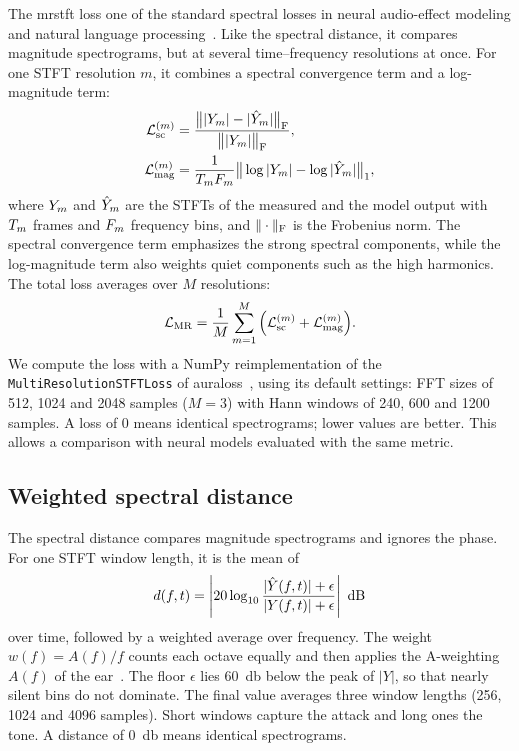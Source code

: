 The \gls{mrstft} loss one of the standard spectral losses in neural audio-effect modeling and natural language processing~\cite{yamamoto2020pwg, steinmetz2020auraloss, comunita2025differentiable}. Like the spectral distance, it compares magnitude spectrograms, but at several time--frequency resolutions at once. For one STFT resolution $m$, it combines a spectral convergence term and a log-magnitude term:
\begin{align}
  \mathcal{L}\sb{\mathrm{sc}}^{(m)} &= \frac{\big\| |Y\sb{m}| - |\hat{Y}\sb{m}| \big\|\sb{\mathrm{F}}}{\big\| |Y\sb{m}| \big\|\sb{\mathrm{F}}}, \label{eq:sc_loss} \\
  \mathcal{L}\sb{\mathrm{mag}}^{(m)} &= \frac{1}{T\sb{m} F\sb{m}} \big\| \log |Y\sb{m}| - \log |\hat{Y}\sb{m}| \big\|\sb{1}, \label{eq:mag_loss}
\end{align}
where $Y\sb{m}$ and $\hat{Y}\sb{m}$ are the STFTs of the measured and the model output with $T\sb{m}$ frames and $F\sb{m}$ frequency bins, and $\|\cdot\|\sb{\mathrm{F}}$ is the Frobenius norm. The spectral convergence term emphasizes the strong spectral components, while the log-magnitude term also weights quiet components such as the high harmonics. The total loss averages over $M$ resolutions:
\begin{equation}
  \mathcal{L}\sb{\mathrm{MR}} = \frac{1}{M} \sum\sb{m=1}^{M} \Big( \mathcal{L}\sb{\mathrm{sc}}^{(m)} + \mathcal{L}\sb{\mathrm{mag}}^{(m)} \Big).
  \label{eq:mrstft}
\end{equation}
We compute the loss with a NumPy reimplementation of the \texttt{MultiResolutionSTFTLoss} of auraloss~\cite{steinmetz2020auraloss}, using its default settings: FFT sizes of 512, 1024 and 2048 samples ($M = 3$) with Hann windows of 240, 600 and 1200 samples. A loss of 0 means identical spectrograms; lower values are better. This allows a comparison with neural models evaluated with the same metric.

\subsection{Weighted spectral distance}
\label{subsec:background_spectral_distance}

The spectral distance compares magnitude spectrograms and ignores the phase. For one STFT window length, it is the mean of
\begin{equation}
  d(f, t) = \left| 20 \log\sb{10} \frac{|\hat{Y}(f,t)| + \epsilon}{|Y(f,t)| + \epsilon} \right| \ \mathrm{dB}
  \label{eq:specdist}
\end{equation}
over time, followed by a weighted average over frequency. The weight $w(f) = A(f)/f$ counts each octave equally and then applies the A-weighting $A(f)$ of the ear~\cite{iec61672}. The floor $\epsilon$ lies \SI{60}{\decibel} below the peak of $|Y|$, so that nearly silent bins do not dominate. The final value averages three window lengths (256, 1024 and 4096 samples). Short windows capture the attack and long ones the tone. A distance of \SI{0}{\decibel} means identical spectrograms.

